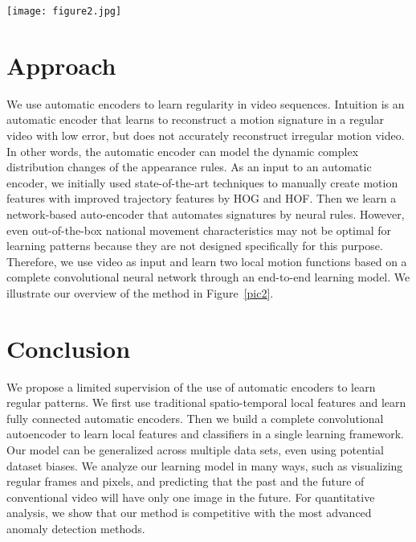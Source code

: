 \documentclass[10pt,twocolumn,letterpaper]{article}
\begin{document}
\begin{figure*}[htp]
	\centering
	\texttt{[image: figure2.jpg]}
	\caption{ Overview of our approach. It utilizes either state-of-the-art motion features or learned features combined with autoencoder to
		reconstruct the scene. The reconstruction error is used to measure the regularity score that can be further analyzed for different applications. }\label{pic2}
\end{figure*}
\section {Approach}
We use automatic encoders to learn regularity in video sequences. Intuition is an automatic encoder that learns to reconstruct a motion signature in a regular video with low error, but does not accurately reconstruct irregular motion video. In other words, the automatic encoder can model the dynamic complex distribution changes of the appearance rules. As an input to an automatic encoder, we initially used state-of-the-art techniques to manually create motion features with improved trajectory features by HOG and HOF\cite{Wang_2013_Action}. Then we learn a network-based auto-encoder that automates signatures by neural rules. However, even out-of-the-box national movement characteristics may not be optimal for learning patterns because they are not designed specifically for this purpose. Therefore, we use video as input and learn two local motion functions based on a complete convolutional neural network through an end-to-end learning model. We illustrate our overview of the method in Figure~\ref{pic2}.

\section{Conclusion}
We propose a limited supervision of the use of automatic encoders to learn regular patterns. We first use traditional spatio-temporal local features and learn fully connected automatic encoders. Then we build a complete convolutional autoencoder to learn local features and classifiers in a single learning framework. Our model can be generalized across multiple data sets, even using potential dataset biases. We analyze our learning model in many ways, such as visualizing regular frames and pixels, and predicting that the past and the future of conventional video will have only one image in the future. For quantitative analysis, we show that our method is competitive with the most advanced anomaly detection methods.
{\small

} 
\end{document}
